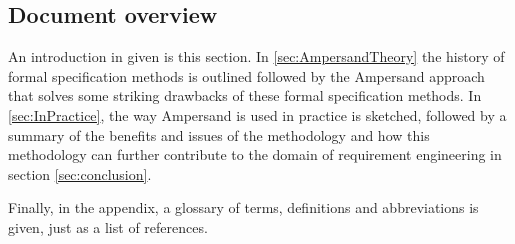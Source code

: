 \subsection{Document overview}
An introduction in given is this section.
In \autoref{sec:AmpersandTheory} the history of formal specification methods is outlined followed by the Ampersand approach that solves some striking drawbacks of these formal specification methods.
In \autoref{sec:InPractice}, the way Ampersand is used in practice is sketched, followed by a summary of the benefits and issues of the methodology and how this methodology can further contribute to the domain of requirement engineering in section \autoref{sec:conclusion}.

Finally, in the appendix, a glossary of terms, definitions and abbreviations is given, just as a list of references.
